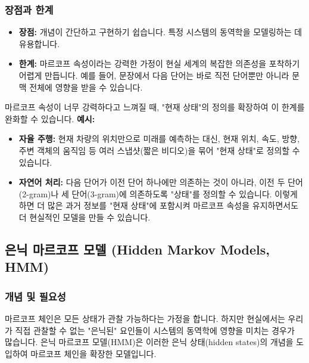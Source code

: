 \documentclass[11pt,a4paper]{article}
\begin{document}
\subsubsection{장점과 한계}
\begin{itemize}
    \item \textbf{장점:} 개념이 간단하고 구현하기 쉽습니다. 특정 시스템의 동역학을 모델링하는 데 유용합니다.
    \item \textbf{한계:} 마르코프 속성이라는 강력한 가정이 현실 세계의 복잡한 의존성을 포착하기 어렵게 만듭니다. 예를 들어, 문장에서 다음 단어는 바로 직전 단어뿐만 아니라 문맥 전체에 영향을 받을 수 있습니다.
\end{itemize}

\begin{tcolorbox}[warningbox, title=마르코프 속성의 한계 극복]
마르코프 속성이 너무 강력하다고 느껴질 때, "현재 상태"의 정의를 확장하여 이 한계를 완화할 수 있습니다.
\textbf{예시:}
\begin{itemize}
    \item \textbf{자율 주행:} 현재 차량의 위치만으로 미래를 예측하는 대신, 현재 위치, 속도, 방향, 주변 객체의 움직임 등 여러 스냅샷(짧은 비디오)을 묶어 "현재 상태"로 정의할 수 있습니다.
    \item \textbf{자연어 처리:} 다음 단어가 이전 단어 하나에만 의존하는 것이 아니라, 이전 두 단어(2-gram)나 세 단어(3-gram)에 의존하도록 "상태"를 정의할 수 있습니다. 이렇게 하면 더 많은 과거 정보를 "현재 상태"에 포함시켜 마르코프 속성을 유지하면서도 더 현실적인 모델을 만들 수 있습니다.
\end{itemize}
\end{tcolorbox}

\subsection{은닉 마르코프 모델 (Hidden Markov Models, HMM)}

\subsubsection{개념 및 필요성}
마르코프 체인은 모든 상태가 관찰 가능하다는 가정을 합니다. 하지만 현실에서는 우리가 직접 관찰할 수 없는 "은닉된" 요인들이 시스템의 동역학에 영향을 미치는 경우가 많습니다. 은닉 마르코프 모델(HMM)은 이러한 은닉 상태(hidden states)의 개념을 도입하여 마르코프 체인을 확장한 모델입니다.
\end{document}
